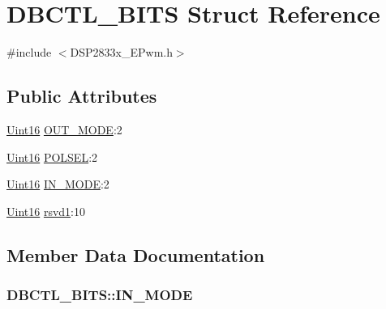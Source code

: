 \hypertarget{struct_d_b_c_t_l___b_i_t_s}{}\section{D\+B\+C\+T\+L\+\_\+\+B\+I\+T\+S Struct Reference}
\label{struct_d_b_c_t_l___b_i_t_s}


{\ttfamily \#include $<$D\+S\+P2833x\+\_\+\+E\+Pwm.\+h$>$}

\subsection*{Public Attributes}
\begin{DoxyCompactItemize}
\item 
\hyperlink{_d_s_p2833x___device_8h_a59a9f6be4562c327cbfb4f7e8e18f08b}{Uint16} \hyperlink{struct_d_b_c_t_l___b_i_t_s_ad7f97d155341f0d6795182f34dd12640}{O\+U\+T\+\_\+\+M\+O\+D\+E}\+:2
\item 
\hyperlink{_d_s_p2833x___device_8h_a59a9f6be4562c327cbfb4f7e8e18f08b}{Uint16} \hyperlink{struct_d_b_c_t_l___b_i_t_s_ae2a2680efb137de1b03367e1ce428977}{P\+O\+L\+S\+E\+L}\+:2
\item 
\hyperlink{_d_s_p2833x___device_8h_a59a9f6be4562c327cbfb4f7e8e18f08b}{Uint16} \hyperlink{struct_d_b_c_t_l___b_i_t_s_a04f7b00aa3605dbe9a2821ffa0e3d783}{I\+N\+\_\+\+M\+O\+D\+E}\+:2
\item 
\hyperlink{_d_s_p2833x___device_8h_a59a9f6be4562c327cbfb4f7e8e18f08b}{Uint16} \hyperlink{struct_d_b_c_t_l___b_i_t_s_a1e8e61d0701b48cf115ecf346c366635}{rsvd1}\+:10
\end{DoxyCompactItemize}


\subsection{Member Data Documentation}
\hypertarget{struct_d_b_c_t_l___b_i_t_s_a04f7b00aa3605dbe9a2821ffa0e3d783}{}
\subsubsection[{I\+N\+\_\+\+M\+O\+D\+E}]{ D\+B\+C\+T\+L\+\_\+\+B\+I\+T\+S\+::\+I\+N\+\_\+\+M\+O\+D\+E}\label{struct_d_b_c_t_l___b_i_t_s_a04f7b00aa3605dbe9a2821ffa0e3d783}
\hypertarget{struct_d_b_c_t_l___b_i_t_s_ad7f97d155341f0d6795182f34dd12640}{}
